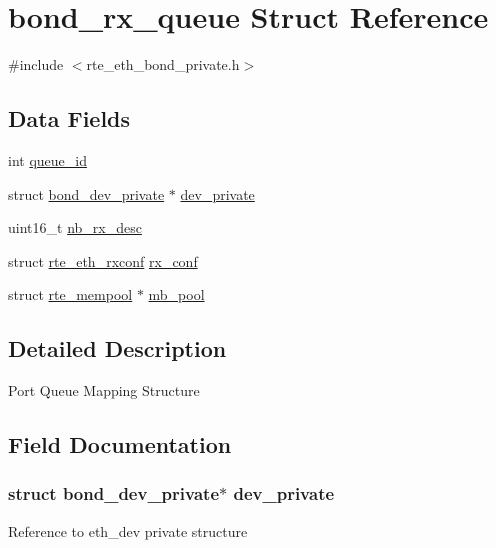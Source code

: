 \hypertarget{structbond__rx__queue}{}\section{bond\+\_\+rx\+\_\+queue Struct Reference}
\label{structbond__rx__queue}


{\ttfamily \#include $<$rte\+\_\+eth\+\_\+bond\+\_\+private.\+h$>$}

\subsection*{Data Fields}
\begin{DoxyCompactItemize}
\item 
int \hyperlink{structbond__rx__queue_a9069963fa1ce9797b853db16f9845d58}{queue\+\_\+id}
\item 
struct \hyperlink{structbond__dev__private}{bond\+\_\+dev\+\_\+private} $\ast$ \hyperlink{structbond__rx__queue_ac596ec953b07433616f515de68124a43}{dev\+\_\+private}
\item 
uint16\+\_\+t \hyperlink{structbond__rx__queue_aaa1aa505a27c4744f950365aafb99484}{nb\+\_\+rx\+\_\+desc}
\item 
struct \hyperlink{structrte__eth__rxconf}{rte\+\_\+eth\+\_\+rxconf} \hyperlink{structbond__rx__queue_a88fc26d5b1d1399c0a401f211a5b766f}{rx\+\_\+conf}
\item 
struct \hyperlink{structrte__mempool}{rte\+\_\+mempool} $\ast$ \hyperlink{structbond__rx__queue_a25fec2758cbb0c178303a91f9b947de2}{mb\+\_\+pool}
\end{DoxyCompactItemize}


\subsection{Detailed Description}
Port Queue Mapping Structure 

\subsection{Field Documentation}
\hypertarget{structbond__rx__queue_ac596ec953b07433616f515de68124a43}{}
\subsubsection[{dev\+\_\+private}]{\setlength{\rightskip}{0pt plus 5cm}struct {\bf bond\+\_\+dev\+\_\+private}$\ast$ dev\+\_\+private}\label{structbond__rx__queue_ac596ec953b07433616f515de68124a43}
Reference to eth\+\_\+dev private structure \hypertarget{structbond__rx__queue_a25fec2758cbb0c178303a91f9b947de2}{}
